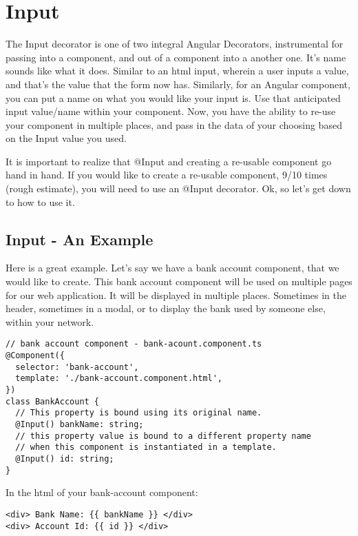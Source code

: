 \maketitle{}
\section{ Input }

The Input decorator is one of two integral Angular Decorators, instrumental
for passing into a component, and out of a component into a another one. It's
name sounds like what it does. Similar to an html input, wherein a user inputs
a value, and that's the value that the form now has. Similarly, for an Angular
component, you can put a name on what you would like your input is. Use that
anticipated input value/name within your component. Now, you have the ability to
re-use your component in multiple places, and pass in the data of your choosing
based on the Input value you used.

It is important to realize that @Input and creating a re-usable component go
hand in hand. If you would like to create a re-usable component, 9/10 times
(rough estimate), you will need to use an @Input decorator. Ok, so let's get
down to how to use it.

\subsection{ Input - An Example }

Here is a great example. Let's say we have a bank account component, that we
would like to create. This bank account component will be used on multiple
pages for our web application. It will be displayed in multiple places.
Sometimes in the header, sometimes in a modal, or to display the bank used by
someone else, within your network.

\begin{lstlisting}
// bank account component - bank-acount.component.ts
@Component({
  selector: 'bank-account',
  template: './bank-account.component.html',
})
class BankAccount {
  // This property is bound using its original name.
  @Input() bankName: string;
  // this property value is bound to a different property name
  // when this component is instantiated in a template.
  @Input() id: string;
}
\end{lstlisting}

In the html of your bank-account component:
\begin{lstlisting}
<div> Bank Name: {{ bankName }} </div>
<div> Account Id: {{ id }} </div>
\end{lstlisting}

